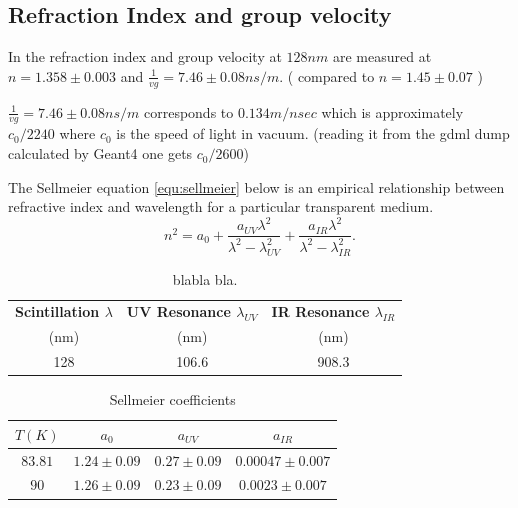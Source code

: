 \documentclass[a4paper]{jpconf}
\begin{document}
\subsection{Refraction Index and group velocity}

In \cite{ref:vg} the refraction index and group velocity  at $128 nm$ are measured at $n = 1.358 \pm 0.003$ and $\frac{1}{vg} = 7.46 \pm 0.08 ns/m$.
( compared to $n= 1.45 \pm 0.07$ \cite{ref:grace})

$\frac{1}{vg} = 7.46 \pm 0.08 ns/m$ corresponds to $0.134 m/nsec$ which is approximately $c_0/2240$ where $c_0$ is the speed of light in vacuum.
(reading it from the gdml dump calculated by Geant4 one gets $c_0/2600$)



The Sellmeier equation \ref{equ:sellmeier} below is an empirical relationship between refractive index and wavelength for a particular transparent medium.
\begin{equation}
n^2 = a_0 + \frac{a_{UV} \lambda^2}{\lambda^2 -\lambda^2_{UV}}+\frac{a_{IR}\lambda^2}{\lambda^2 - \lambda^2_{IR}}.
 \label{equ:sellmeier}
\end{equation}

 \begin{table}[h!]
  \begin{center}
    \label{tab:table1}
    \begin{tabular}{|c|c|c|} 
      \hline
      \textbf{ Scintillation $\lambda$} &\textbf{UV Resonance $\lambda_{UV}$} &\textbf{IR Resonance $\lambda_{IR}$}\\
 (nm)           & (nm)          &(nm) \\
      \hline
128 & 106.6 &908.3\\
      \hline
    \end{tabular}
  \end{center}
  \caption{blabla bla.}
 \end{table}
 
 \begin{table}[h!]
  \begin{center}
    \label{tab:table1}
    \begin{tabular}{|c|c|c|c|} 
      \hline
\textbf{ $T (K) $}& \textbf{ $a_0$} & \textbf{ $a_{UV}$} & \textbf{ $a_{IR}$ }\\
\hline
      $83.81$ & $1.24\pm0.09$ & $0.27\pm0.09$ & $0.00047\pm0.007$ \\
$90$ & $1.26\pm 0.09$& $0.23\pm 0.09$ & $0.0023\pm0.007$ \\
      \hline
    \end{tabular}
  \end{center}
  \caption{Sellmeier coefficients}
 \end{table}
 
\end{document}
